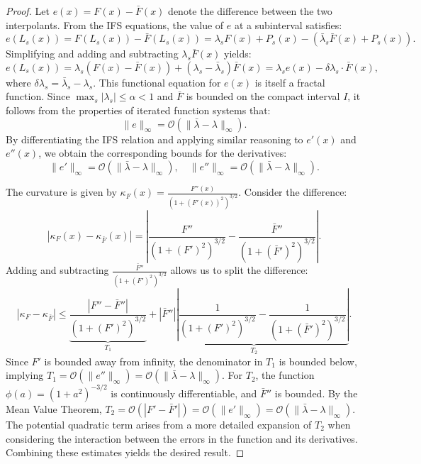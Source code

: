 \documentclass[10pt,a4paper]{amsart}
\begin{document}
	\begin{proof}
		Let \( e(x) = F(x) - \bar{F}(x) \) denote the difference between the two interpolants. From the IFS equations, the value of \( e \) at a subinterval satisfies:
		\[
		e(L_s(x)) = F(L_s(x)) - \bar{F}(L_s(x)) = \lambda_s F(x) + P_s(x) - \left( \bar{\lambda}_s \bar{F}(x) + P_s(x) \right).
		\]
		Simplifying and adding and subtracting \( \lambda_s \bar{F}(x) \) yields:
		\[
		e(L_s(x)) = \lambda_s (F(x) - \bar{F}(x)) + (\lambda_s - \bar{\lambda}_s) \bar{F}(x) = \lambda_s e(x) - \delta\lambda_s \cdot \bar{F}(x),
		\]
		where \( \delta\lambda_s = \bar{\lambda}_s - \lambda_s \). This functional equation for \( e(x) \) is itself a fractal function. Since \( \max_s |\lambda_s| \leq \alpha < 1 \) and \( \bar{F} \) is bounded on the compact interval \( I \), it follows from the properties of iterated function systems that:
		\[
		\|e\|_\infty = \mathcal{O}(\|\bar{\lambda} - \lambda\|_\infty).
		\]
		By differentiating the IFS relation and applying similar reasoning to \( e'(x) \) and \( e''(x) \), we obtain the corresponding bounds for the derivatives:
		\[
		\|e'\|_\infty = \mathcal{O}(\|\bar{\lambda} - \lambda\|_\infty), \quad \|e''\|_\infty = \mathcal{O}(\|\bar{\lambda} - \lambda\|_\infty).
		\]
		
		The curvature is given by \( \kappa_F(x) = \frac{F''(x)}{(1 + (F'(x))^2)^{3/2}} \). Consider the difference:
		\[
		|\kappa_F(x) - \kappa_{\bar{F}}(x)| = \left| \frac{F''}{(1 + (F')^2)^{3/2}} - \frac{\bar{F}''}{(1 + (\bar{F}')^2)^{3/2}} \right|.
		\]
		Adding and subtracting \( \frac{\bar{F}''}{(1 + (F')^2)^{3/2}} \) allows us to split the difference:
		\[
		|\kappa_F - \kappa_{\bar{F}}| \leq \underbrace{\frac{|F'' - \bar{F}''|}{(1 + (F')^2)^{3/2}}}_{T_1} + \underbrace{|\bar{F}''| \left| \frac{1}{(1 + (F')^2)^{3/2}} - \frac{1}{(1 + (\bar{F}')^2)^{3/2}} \right|}_{T_2}.
		\]
		Since \( F' \) is bounded away from infinity, the denominator in \( T_1 \) is bounded below, implying \( T_1 = \mathcal{O}(\|e''\|_\infty) = \mathcal{O}(\|\bar{\lambda} - \lambda\|_\infty) \). For \( T_2 \), the function \( \phi(a) = (1+a^2)^{-3/2} \) is continuously differentiable, and \( \bar{F}'' \) is bounded. By the Mean Value Theorem, \( T_2 = \mathcal{O}(|F' - \bar{F}'|) = \mathcal{O}(\|e'\|_\infty) = \mathcal{O}(\|\bar{\lambda} - \lambda\|_\infty) \). The potential quadratic term arises from a more detailed expansion of \( T_2 \) when considering the interaction between the errors in the function and its derivatives. Combining these estimates yields the desired result.
	\end{proof}
\end{document}
